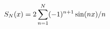\documentclass[preview]{standalone}
\begin{document}
\begin{align*}
\special{dvisvgm:raw <g id='unique000'>}S_N(x)=2\sum_{n=1}^N(-1)^{n+1}\sin(nx)/n\special{dvisvgm:raw </g>}
\end{align*}
\end{document}
